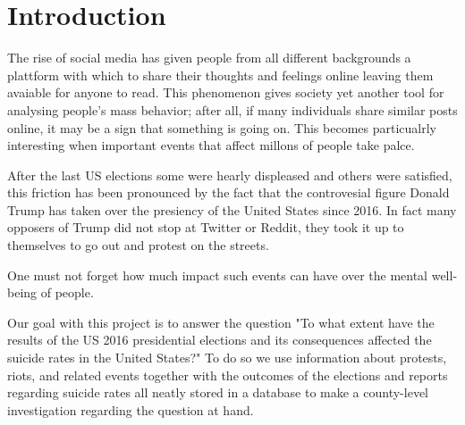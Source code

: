 \section{Introduction}
\label{g1:sec:introduction}

The rise of social media has given people from all different
backgrounds a plattform with which to share their thoughts
and feelings online leaving them avaiable for anyone to read.
This phenomenon gives society yet another tool for analysing
people's mass behavior; after all, if many individuals share
similar posts online, it may be a sign that something
is going on.
This becomes particualrly interesting
when important events that affect millons of people take
palce.

After the last US elections
some were hearly displeased and others were
satisfied, this friction has been pronounced by the fact
that the controvesial figure Donald Trump has taken over
the presiency of the United States since 2016. In fact many opposers of Trump did not stop at Twitter or Reddit, they
took it up to themselves to go out and protest on the streets.

One must not forget how much impact such events can have over
the mental well-being of people.

Our goal with this project is to answer the question
"To what extent have the results of the US 2016 presidential
elections and its consequences
affected the suicide rates in the United States?"
To do so we use information about protests, riots, and
related events together with the outcomes of the elections
and reports regarding suicide rates all neatly stored in a database
to make a county-level investigation
regarding the question at hand.
